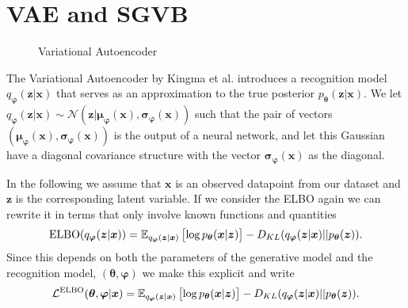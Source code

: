 \section{VAE and SGVB}

\begin{figure}[H]
  \label{tikz:VAE_graphical_model}
  \centering
  \caption{Variational Autoencoder}
\end{figure}

The Variational Autoencoder by Kingma et al. \cite{kingma_auto-encoding_2013}
introduces a recognition model $q_{\bm{\varphi}}(\bm{z} | \bm{x})$ that serves as
an approximation to the true posterior $p_{\bm{\theta}}( \bm{z} | \bm{x})$. We let $q_{\bm{\varphi}}(\bm{z} | \bm{x}) \sim
\mathcal{N}(\bm{z}| \bm{\mu_{\bm{\varphi}}}(\bm{x}),
\bm{\sigma}_{\bm{\varphi}}(\bm{x}))$ such that the pair of vectors
$(\bm{\mu}_{\bm{\varphi}}(\bm{x}), \bm{\sigma}_{\bm{\varphi}}(\bm{x}))$ is the
output of a neural network, and let this Gaussian have a diagonal covariance
structure with the vector $\bm{\sigma}_{\bm{\varphi}}(\bm{x})$ as the diagonal.

In the following we assume that $\bm{x}$ is an observed datapoint from our
dataset and $\bm{z}$ is the corresponding latent variable. If we consider the
ELBO again we can rewrite it in terms that only involve known functions and quantities
\begin{equation}
  \label{eq:ELBO_VAE}
  \text{ELBO}(q_{\bm{\varphi}}(\bm{z} | \bm{x})) = \operatorname{\mathbb{E}}_{q_{\bm{\varphi}}(\bm{z} | \bm{x})}\left[ \log p_{\bm{\theta}}(\bm{x} | \bm{z}) \right] - D_{KL}(q_{\bm{\varphi}}(\bm{z} | \bm{x}) || p_{\bm{\theta}}(\bm{z})).
\end{equation}
Since this depends on both the parameters of the generative model and the
recognition model, $(\bm{\theta}, \bm{\varphi})$ we make this explicit and write
\begin{equation}
  \label{eq:VAE_ELBO}
  \mathcal{L}^{\text{ELBO}}(\bm{\theta}, \bm{\varphi} | \bm{x}) = \operatorname{\mathbb{E}}_{q_{\bm{\varphi}}(\bm{z} | \bm{x})}\left[ \log p_{\bm{\theta}}(\bm{x} | \bm{z}) \right] - D_{KL}(q_{\bm{\varphi}}(\bm{z} | \bm{x}) || p_{\bm{\theta}}(\bm{z})).
\end{equation}

